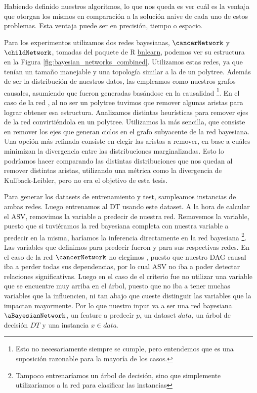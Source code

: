 Habiendo definido nuestros algoritmos, lo que nos queda es ver cuál es la ventaja que otorgan los mismos en comparación a la solución naive de cada uno de estos problemas. Esta ventaja puede ser en precisión, tiempo o espacio. 

Para los experimentos utilizamos dos redes bayesianas, $\cancerNetwork$ y $\childNetwork$, tomadas del paquete de R \href{https://www.bnlearn.com/bnrepository/}{bnlearn}, podemos ver su estructura en la Figura \ref{fig:bayesian_networks_combined}. Utilizamos estas redes, ya que tenían un tamaño manejable y una topología similar a la de un polytree. Además de ser la distribución de nuestros datos, las empleamos como nuestros grafos causales, asumiendo que fueron generadas basándose en la causalidad \footnote{Esto no necesariamente siempre se cumple, pero entendemos que es una suposición razonable para la mayoría de los casos.}.
En el caso de la red \childNetwork, al no ser un polytree tuvimos que remover algunas aristas para lograr obtener esa estructura. Analizamos distintas heurísticas para remover ejes de la red convirtiéndola en un polytree. Utilizamos la más sencilla, que consiste en remover los ejes que generan ciclos en el grafo subyacente de la red bayesiana. Una opción más refinada consiste en elegir las aristas a remover, en base a cuáles minimizan la divergencia entre las distribuciones marginalizadas. Esto lo podríamos hacer comparando las distintas distribuciones que nos quedan al remover distintas aristas, utilizando una métrica como la divergencia de Kullback-Leibler, pero no era el objetivo de esta tesis. 

Para generar los datasets de entrenamiento y test, sampleamos instancias de ambas redes. Luego entrenamos al DT usando este dataset. A la hora de calcular el ASV, removimos la variable a predecir de nuestra red. Removemos la variable, puesto que si tuviéramos la red bayesiana completa con nuestra variable a predecir en la misma, haríamos la inferencia directamente en la red bayesiana \footnote{Tampoco entrenaríamos un árbol de decisión, sino que simplemente utilizaríamos a la red para clasificar las instancias}. Las variables que definimos para predecir fueron  y  para sus respectivas redes. En el caso de la red $\cancerNetwork$ no elegimos , puesto que nuestro DAG causal iba a perder todas sus dependencias, por lo cual ASV no iba a poder detectar relaciones significativas. Luego en el caso de \childNetwork{} el criterio fue no utilizar una variable que se encuentre muy arriba en el árbol, puesto que no iba a tener muchas variables que la influencien, ni tan abajo que cueste distinguir las variables que la impactan mayormente. Por lo que nuestro input va a ser una red bayesiana $\aBayesianNetwork$, un feature a predecir $p$, un dataset $data$, un árbol de decisión $DT$ y una instancia $x \in data$. 

